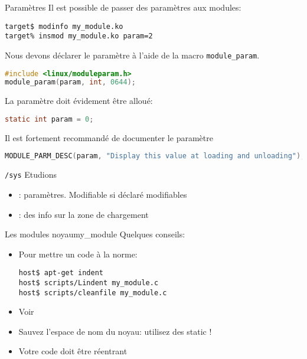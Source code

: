 \begin{frame}[fragile=singleslide]{Paramètres}
  Il est possible de passer des paramètres aux modules:
  \begin{lstlisting}
target$ modinfo my_module.ko 
target% insmod my_module.ko param=2  
  \end{lstlisting} %
  Nous devons déclarer le paramètre à l'aide de la macro \texttt{module\_param}. 
  \begin{lstlisting}[language=c]
#include <linux/moduleparam.h>
module_param(param, int, 0644);
  \end{lstlisting} 
  La paramètre doit évidement être alloué:
  \begin{lstlisting}[language=c]
static int param = 0;
  \end{lstlisting} 
  Il est fortement recommandé de documenter le paramètre
  \begin{lstlisting}[language=c]
MODULE_PARM_DESC(param, "Display this value at loading and unloading");
  \end{lstlisting} 
\end{frame}

\begin{frame}[fragile=singleslide]{\texttt{/sys}}
  Etudions 
  \begin{itemize}
  \item                       {}:
    paramètres. Modifiable si déclaré modifiables
  \item {}:  des info sur  la zone
    de chargement
  \end{itemize}
\end{frame}

\begin{frame}[fragile=singleslide]{Les modules noyau}{my\_module}
  Quelques conseils:
  \begin{itemize} 
  \item  Pour mettre un code à la norme:
    \begin{lstlisting}
host$ apt-get indent
host$ scripts/Lindent my_module.c
host$ scripts/cleanfile my_module.c
    \end{lstlisting} %
  \item Voir 
  \item Sauvez l'espace de nom du noyau: utilisez des static !
  \item Votre code doit être réentrant
  \end{itemize} 
\end{frame}

